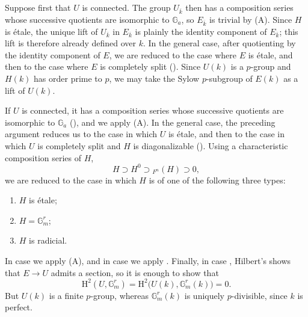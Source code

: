 Suppose first that \(U\) is connected.  The group
\(U_{\overline{k}}\) then has a composition series whose
successive quotients are isomorphic to \(\mathbb G_a\), so
\(E_{\overline{k}}\) is trivial by (A).  Since \(H\) is
étale, the unique lift of \(U_{\overline{k}}\) in
\(E_{\overline{k}}\) is plainly the identity component of
\(E_{\overline{k}}\); this lift is therefore already defined
over \(k\).  In the general case, after quotienting by the
identity component of \(E\), we are reduced to the case where
\(E\) is étale, and then to the case where \(E\) is completely
split ().  Since \(U(k)\) is a \(p\)-group and \(H(k)\) has
order prime to \(p\), we may take the Sylow \(p\)-subgroup of
\(E(k)\) as a lift of \(U(k)\).

If \(U\) is connected, it has a composition series whose
successive quotients are isomorphic to \(\mathbb G_a\)
(), and we apply (A).  In the general case, the
preceding argument reduces us to the case in which \(U\) is
étale, and then to the case in which \(U\) is completely split
and \(H\) is diagonalizable ().  Using a characteristic
composition series of \(H\),
\[
  H\supset H^0\supset{}_{F^n}(H)\supset0,
\]
we are reduced to the case in which \(H\) is of one of the
following three types:
\begin{enumerate}
\item[(a)] \(H\) is étale;
\item[(b)] \(H=\mathbb G_m^r\);
\item[(c)] \(H\) is radicial.
\end{enumerate}
In case  we apply (A), and in case  we apply .
Finally, in case , Hilbert's  shows that
\(E\longrightarrow U\) admits a section, so it is enough to show
that
\[
  \mathrm H^2(U,\mathbb G_m^r)
    =\mathrm H^2\bigl(U(k),\mathbb G_m^r(k)\bigr)=0.
\]
But \(U(k)\) is a finite \(p\)-group, whereas
\(\mathbb G_m^r(k)\) is uniquely \(p\)-divisible, since \(k\) is
perfect.

